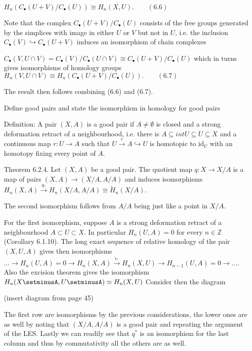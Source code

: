 \(H_n(C_\bullet(U + V) / C_\bullet(U)) \cong H_n(X, U). \qquad (6.6)\)

Note that the complex \(C_\bullet(U + V) / C_\bullet(U)\) consists of the free groups generated by the 
simplices with image in either \(U\) or \(V\) but not in \(U\), 
i.e. the inclusion \(C_\bullet(V) \hookrightarrow C_\bullet(U + V)\) induces an isomorphism of chain complexes

\(C_\bullet(V, U \cap V) = C_\bullet(V) / C_\bullet(U \cap V) \cong C_\bullet(U + V) / C_\bullet(U)\)
which in turns gives isomorphisms of homology groups
\(H_n(V, U \cap V) \cong H_n(C_\bullet(U + V) / C_\bullet(U)). \qquad (6.7)\)

The result then follows combining (6.6) and (6.7).


Define good pairs and state the isomorphism in homology for good pairs

Definition: 
A pair \((X, A)\) is a good pair if \(A \neq \emptyset\) is closed and a strong deformation retract of a neighbourhood, 
i.e. there is \(A \subseteq int U \subseteq U \subseteq X\) and a continuous map \(r: U \to A\) such that 
\(U \xrightarrow{r} A \hookrightarrow U\) is homotopic to \(\text{id}_U\) with an homotopy fixing every point of \(A\).

Theorem 6.2.4. 
Let \((X, A)\) be a good pair. The quotient map \(q: X \to X/A\) is a map of pairs \((X, A) \to (X/A, A/A)\) and induces isomorphisms 
\(H_n(X, A) \xrightarrow{q_*} H_n(X/A, A/A) \cong \tilde{H}_n(X/A).\)

The second isomorphism follows from \( A/A \) being just like a point in \( X / A \).

For the first isomorphism, suppose \(A\) is a strong deformation retract of a neighbourhood \(A \subset U \subset X\). 
In particular \(H_n(U, A) = 0\) for every \(n \in \mathbb{Z}\) (Corollary 6.1.10). 
The long exact sequence of relative homology of the pair \((X, U, A)\) gives then isomorphisms
\(\dots \longrightarrow H_n(U, A) = 0 \longrightarrow H_n(X, A) \xrightarrow{\hat{\imath}_*} H_n(X, U) \longrightarrow H_{n-1}(U, A) = 0 \longrightarrow \dots.\)
Also the excision theorem gives the isomorphism \( H_n(X\setminusA, U\setminusA) \simeq H_n(X, U)\)
Consider then the diagram

(insert diagram from page 45)

The first row are isomorphisms by the previous considerations, the lower ones are as well by noting that \( (X / A, A / A) \)
is a good pair and repeating the argument of the LES. Lastly we can readily see that \( q^\ast \) is an isomorphism for the last column
and thus by commutativity all the others are as well.



